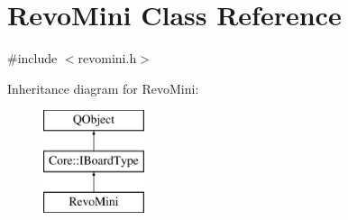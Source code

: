 \hypertarget{class_revo_mini}{\section{Revo\-Mini Class Reference}
\label{class_revo_mini}
}


{\ttfamily \#include $<$revomini.\-h$>$}

Inheritance diagram for Revo\-Mini\-:\begin{figure}[H]
\begin{center}
\leavevmode
\includegraphics[height=3.000000cm]{class_revo_mini}
\end{center}
\end{figure}
